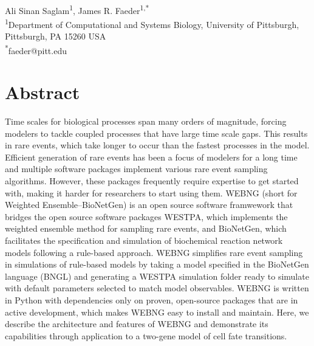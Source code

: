 \documentclass[10pt,letterpaper]{article}
\begin{document}
\vspace*{0.35in}

\begin{flushleft}
{\Large
\textbf{}
}
\newline
\\
Ali Sinan Saglam\textsuperscript{1},
James R. Faeder\textsuperscript{1,*}
\\
\bigskip
\textsuperscript{1}Department of Computational and Systems Biology, University of Pittsburgh, Pittsburgh, PA 15260 USA
\\
\bigskip
\textsuperscript{*}faeder@pitt.edu

\end{flushleft}

\section*{Abstract}
Time scales for biological processes span many orders of magnitude, forcing modelers to tackle coupled processes that have large time scale gaps. This results in rare events, which take longer to occur than the fastest processes in the model. Efficient generation of rare events has been a focus of modelers for a long time and multiple software packages implement various rare event sampling algorithms. However, these packages frequently require expertise to get started with, making it harder for researchers to start using them. WEBNG (short for Weighted Ensemble--BioNetGen) is an open source software framwework that bridges the open source software packages WESTPA, which implements the weighted ensemble method for sampling rare events, and BioNetGen, which facilitates the specification and simulation of biochemical reaction network models following a rule-based approach. WEBNG simplifies rare event sampling in simulations of rule-based models by taking a model specified in the BioNetGen language (BNGL) and generating a WESTPA simulation folder ready to simulate with default parameters selected to match model observables. WEBNG is written in Python with dependencies only on proven, open-source packages that are in active development, which makes WEBNG easy to install and maintain. Here, we describe the architecture and features of WEBNG and demonstrate its capabilities through application to a two-gene model of cell fate transitions.

\linenumbers
\end{document}
